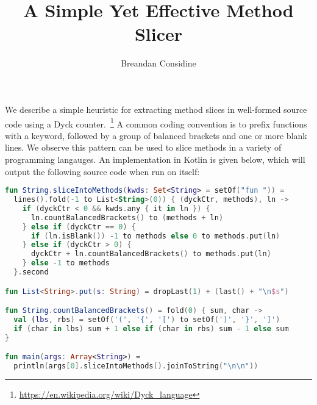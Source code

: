 \documentclass[12pt]{article}
\title{A Simple Yet Effective Method Slicer}
\author{Breandan Considine}
\begin{document}
  \maketitle
We describe a simple heuristic for extracting method slices in well-formed source code using a Dyck counter.~\footnote{\url{https://en.wikipedia.org/wiki/Dyck\_language}} A common coding convention is to prefix functions with a keyword, followed by a group of balanced brackets and one or more blank lines. We observe this pattern can be used to slice methods in a variety of programming langauges. An implementation in Kotlin is given below, which will output the following source code when run on itself:

  \vspace{11pt}

  \begin{lstlisting}[basicstyle=\footnotesize\ttfamily, language=kotlin,label={lst:lstlisting}]
fun String.sliceIntoMethods(kwds: Set<String> = setOf("fun ")) =
  lines().fold(-1 to List<String>(0)) { (dyckCtr, methods), ln ->
    if (dyckCtr < 0 && kwds.any { it in ln }) {
      ln.countBalancedBrackets() to (methods + ln)
    } else if (dyckCtr == 0) {
      if (ln.isBlank()) -1 to methods else 0 to methods.put(ln)
    } else if (dyckCtr > 0) {
      dyckCtr + ln.countBalancedBrackets() to methods.put(ln)
    } else -1 to methods
  }.second

fun List<String>.put(s: String) = dropLast(1) + (last() + "\n$s")

fun String.countBalancedBrackets() = fold(0) { sum, char ->
  val (lbs, rbs) = setOf('(', '{', '[') to setOf(')', '}', ']')
  if (char in lbs) sum + 1 else if (char in rbs) sum - 1 else sum
}

fun main(args: Array<String>) =
  println(args[0].sliceIntoMethods().joinToString("\n\n"))
  \end{lstlisting}
\end{document}
